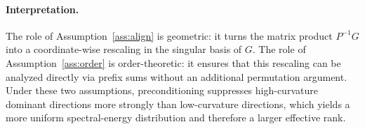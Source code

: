 \paragraph{Interpretation.}
The role of Assumption~\ref{ass:align} is geometric: it turns the matrix product $P^{-1}G$ into a coordinate-wise rescaling in the singular basis of $G$. The role of Assumption~\ref{ass:order} is order-theoretic: it ensures that this rescaling can be analyzed directly via prefix sums without an additional permutation argument. Under these two assumptions, preconditioning suppresses high-curvature dominant directions more strongly than low-curvature directions, which yields a more uniform spectral-energy distribution and therefore a larger effective rank.
